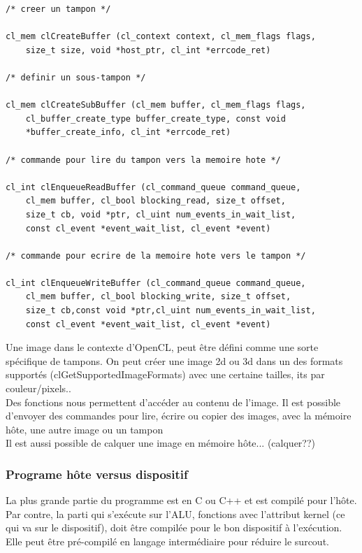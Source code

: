 \documentclass[oneside]{book}
\begin{document}
\begin{lstlisting}
/* creer un tampon */

cl_mem clCreateBuffer (cl_context context, cl_mem_flags flags,
	size_t size, void *host_ptr, cl_int *errcode_ret)

/* definir un sous-tampon */

cl_mem clCreateSubBuffer (cl_mem buffer, cl_mem_flags flags,
	cl_buffer_create_type buffer_create_type, const void
	*buffer_create_info, cl_int *errcode_ret)

/* commande pour lire du tampon vers la memoire hote */

cl_int clEnqueueReadBuffer (cl_command_queue command_queue,
	cl_mem buffer, cl_bool blocking_read, size_t offset,
	size_t cb, void *ptr, cl_uint num_events_in_wait_list,
	const cl_event *event_wait_list, cl_event *event)

/* commande pour ecrire de la memoire hote vers le tampon */

cl_int clEnqueueWriteBuffer (cl_command_queue command_queue,
	cl_mem buffer, cl_bool blocking_write, size_t offset,
	size_t cb,const void *ptr,cl_uint num_events_in_wait_list,
	const cl_event *event_wait_list, cl_event *event)
\end{lstlisting}

Une image dans le contexte d'OpenCL, peut être défini comme une sorte spécifique de tampons. On peut créer une image 2d ou 3d dans un des formats supportés (clGetSupportedImageFormats) avec une certaine tailles, its par couleur/pixels..\\

Des fonctions nous permettent d'accéder au contenu de l'image. Il est possible d'envoyer des commandes pour lire, écrire ou copier des images, avec la mémoire hôte, une autre image ou un tampon\\

Il est aussi possible de calquer une image en mémoire hôte... (calquer??)\\

\subsubsection{Programe hôte versus dispositif}
La plus grande partie du programme est en C ou C++ et est compilé pour l'hôte. Par contre, la parti qui s'exécute sur l'ALU, fonctions avec l'attribut kernel (ce qui va sur le dispositif), doit être compilée pour le bon dispositif à l'exécution. Elle peut être pré-compilé en langage intermédiaire pour réduire le surcout.\\
\end{document}
